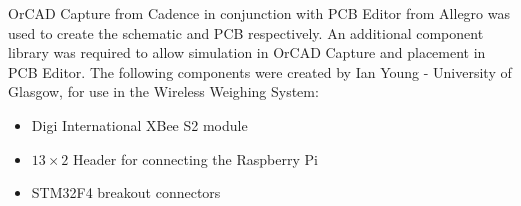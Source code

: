 OrCAD Capture from Cadence in conjunction with PCB Editor from Allegro was used to create the schematic and PCB respectively.  An additional component library was required to allow simulation in OrCAD Capture and placement in PCB Editor. The following components were created by Ian Young - University of Glasgow, for use in the Wireless Weighing System:
	\begin{itemize}
		\item Digi International XBee S2 module
		\item \(13\times2\) Header for connecting the Raspberry Pi
		\item STM32F4 breakout connectors
	\end{itemize}

